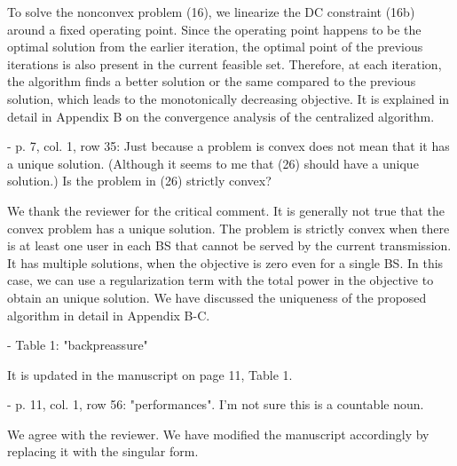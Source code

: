 \begin{itemize}
\begin{itemize}
\resp To solve the nonconvex problem (16), we linearize the DC constraint (16b) around a fixed operating point. Since the operating point happens to be the optimal solution from the earlier iteration, the optimal point of the previous iterations is also present in the current feasible set. Therefore, at each iteration, the algorithm finds a better solution or the same compared to the previous solution, which leads to the monotonically decreasing objective. It is explained in detail in Appendix B on the convergence analysis of the centralized algorithm.

 - p. 7, col. 1, row 35: Just because a problem is convex does not mean that it has a unique solution. (Although it seems to me that (26) should have a unique solution.) Is the problem in (26) strictly convex?

\resp We thank the reviewer for the critical comment. It is generally not true that the convex problem has a unique solution. The problem is strictly convex when there is at least one user in each BS that cannot be served by the current transmission. It has multiple solutions, when the objective is zero even for a single BS. In this case, we can use a regularization term with the total power in the objective to obtain an unique solution. We have discussed the uniqueness of the proposed algorithm in detail in Appendix B-C.

 - Table 1: "backpreassure"

\resp It is updated in the manuscript on page 11, Table 1.

 - p. 11, col. 1, row 56: "performances". I'm not sure this is a countable noun.

\resp We agree with the reviewer. We have modified the manuscript accordingly by replacing it with the singular form.

\end{itemize}

\end{itemize}